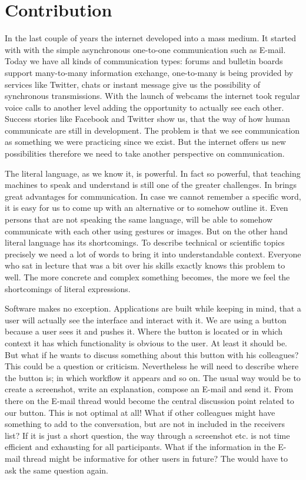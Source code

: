 \section{Contribution}\label{contribution}

In the last couple of years the internet developed into a mass medium. It started with with the simple asynchronous one-to-one communication such as E-mail. Today we have all kinds of communication types: forums and bulletin boards support many-to-many information exchange, one-to-many is being provided by services like Twitter, chats or instant message give us the possibility of synchronous transmissions. With the launch of webcams the internet took regular voice calls to another level adding the opportunity to actually see each other. Success stories like Facebook and Twitter show us, that the way of how human communicate are still in development. The problem is that we see communication as something we were practicing since we exist. But the internet offers us new possibilities therefore we need to take another perspective on communication. 

The literal language, as we know it, is powerful. In fact so powerful, that teaching machines to speak and understand is still one of the greater challenges. In brings great advantages for communication. In case we cannot remember a specific word, it is easy for us to come up with an alternative or to somehow outline it. Even persons that are not speaking the same language, will be able to somehow communicate with each other using gestures or images. But on the other hand literal language has its shortcomings. To describe technical or scientific topics precisely we need a lot of words to bring it into understandable context. Everyone who sat in lecture that was a bit over his skills exactly knows this problem to well. The more concrete and complex something becomes, the more we feel the shortcomings of literal expressions. 

Software makes no exception. Applications are built while keeping in mind, that a user will actually see the interface and interact with it. We are using a button because a user sees it and pushes it. Where the button is located or in which context it has which functionality is obvious to the user. At least it should be. But what if he wants to discuss something about this button with his colleagues? This could be a question or criticism. Nevertheless he will need to describe where the button is; in which workflow it appears and so on. The usual way would be to create a screenshot, write an explanation, compose an E-mail and send it. From there on the E-mail thread would become the central discussion point related to our button. This is not optimal at all! What if other colleagues might have something to add to the conversation, but are not in included in the receivers list? If it is just a short question, the way through a screenshot etc. is not time efficient and exhausting for all participants. What if the information in the E-mail thread might be informative for other users in future? The would have to ask the same question again. 

